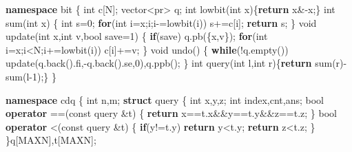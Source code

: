 \documentclass[
]{article}
\newenvironment{Shaded}{}{}
\newcommand{\AttributeTok}[1]{\textcolor[rgb]{0.49,0.56,0.16}{#1}}
\newcommand{\ControlFlowTok}[1]{\textcolor[rgb]{0.00,0.44,0.13}{\textbf{#1}}}
\newcommand{\DataTypeTok}[1]{\textcolor[rgb]{0.56,0.13,0.00}{#1}}
\newcommand{\DecValTok}[1]{\textcolor[rgb]{0.25,0.63,0.44}{#1}}
\newcommand{\KeywordTok}[1]{\textcolor[rgb]{0.00,0.44,0.13}{\textbf{#1}}}
\newcommand{\NormalTok}[1]{#1}
\begin{document}
\begin{Shaded}
\begin{Highlighting}[]
\KeywordTok{namespace}\NormalTok{ bit}
\NormalTok{\{}
    \DataTypeTok{int}\NormalTok{ c[N];}
\NormalTok{    vector\textless{}pr\textgreater{} q;}
    \DataTypeTok{int}\NormalTok{ lowbit(}\DataTypeTok{int}\NormalTok{ x)\{}\ControlFlowTok{return}\NormalTok{ x\&{-}x;\}}
    \DataTypeTok{int}\NormalTok{ sum(}\DataTypeTok{int}\NormalTok{ x)}
\NormalTok{    \{}
        \DataTypeTok{int}\NormalTok{ s=}\DecValTok{0}\NormalTok{;}
        \ControlFlowTok{for}\NormalTok{(}\DataTypeTok{int}\NormalTok{ i=x;i;i{-}=lowbit(i)) s+=c[i];}
        \ControlFlowTok{return}\NormalTok{ s;}
\NormalTok{    \}}
    \DataTypeTok{void}\NormalTok{ update(}\DataTypeTok{int}\NormalTok{ x,}\DataTypeTok{int}\NormalTok{ v,}\DataTypeTok{bool}\NormalTok{ save=}\DecValTok{1}\NormalTok{)}
\NormalTok{    \{}
        \ControlFlowTok{if}\NormalTok{(save) q.pb(\{x,v\});}
        \ControlFlowTok{for}\NormalTok{(}\DataTypeTok{int}\NormalTok{ i=x;i\textless{}N;i+=lowbit(i)) c[i]+=v;}
\NormalTok{    \}}
    \DataTypeTok{void}\NormalTok{ undo()}
\NormalTok{    \{}
        \ControlFlowTok{while}\NormalTok{(!q.empty())}
\NormalTok{            update(q.back().fi,{-}q.back().se,}\DecValTok{0}\NormalTok{),q.ppb();}
\NormalTok{    \}}
    \DataTypeTok{int}\NormalTok{ query(}\DataTypeTok{int}\NormalTok{ l,}\DataTypeTok{int}\NormalTok{ r)\{}\ControlFlowTok{return}\NormalTok{ sum(r){-}sum(l{-}}\DecValTok{1}\NormalTok{);\}}
\NormalTok{\}}

\KeywordTok{namespace}\NormalTok{ cdq}
\NormalTok{\{}
    \DataTypeTok{int}\NormalTok{ n,m;}
    \KeywordTok{struct}\NormalTok{ query}
\NormalTok{    \{}
        \DataTypeTok{int}\NormalTok{ x,y,z;}
        \DataTypeTok{int}\NormalTok{ index,cnt,ans;}
        \DataTypeTok{bool} \KeywordTok{operator}\NormalTok{ ==(}\AttributeTok{const}\NormalTok{ query \&t)}
\NormalTok{        \{}
            \ControlFlowTok{return}\NormalTok{ x==t.x\&\&y==t.y\&\&z==t.z;}
\NormalTok{        \}}
        \DataTypeTok{bool} \KeywordTok{operator}\NormalTok{ \textless{}(}\AttributeTok{const}\NormalTok{ query \&t)}
\NormalTok{        \{}
            \ControlFlowTok{if}\NormalTok{(y!=t.y) }\ControlFlowTok{return}\NormalTok{ y\textless{}t.y;}
            \ControlFlowTok{return}\NormalTok{ z\textless{}t.z;}
\NormalTok{        \}}
\NormalTok{    \}q[MAXN],t[MAXN];}


\end{Highlighting}
\end{Shaded}
\end{document}
